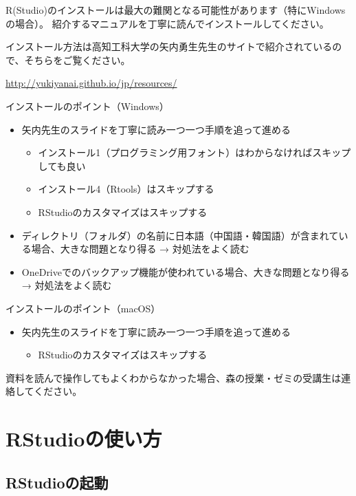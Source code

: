 \documentclass[]{book}
\providecommand{\tightlist}{%
  \setlength{\itemsep}{0pt}\setlength{\parskip}{0pt}}
\begin{document}
R(Studio)のインストールは最大の難関となる可能性があります（特にWindowsの場合）。
紹介するマニュアルを丁寧に読んでインストールしてください。

インストール方法は高知工科大学の矢内勇生先生のサイトで紹介されているので、そちらをご覧ください。

\url{http://yukiyanai.github.io/jp/resources/}

インストールのポイント（Windows）

\begin{itemize}
\tightlist
\item
  矢内先生のスライドを丁寧に読み一つ一つ手順を追って進める

  \begin{itemize}
  \tightlist
  \item
    インストール1（プログラミング用フォント）はわからなければスキップしても良い
  \item
    インストール4（Rtools）はスキップする
  \item
    RStudioのカスタマイズはスキップする
  \end{itemize}
\item
  ディレクトリ（フォルダ）の名前に日本語（中国語・韓国語）が含まれている場合、大きな問題となり得る
  → 対処法をよく読む
\item
  OneDriveでのバックアップ機能が使われている場合、大きな問題となり得る →
  対処法をよく読む
\end{itemize}

インストールのポイント（macOS）

\begin{itemize}
\tightlist
\item
  矢内先生のスライドを丁寧に読み一つ一つ手順を追って進める

  \begin{itemize}
  \tightlist
  \item
    RStudioのカスタマイズはスキップする
  \end{itemize}
\end{itemize}

資料を読んで操作してもよくわからなかった場合、森の授業・ゼミの受講生は連絡してください。

\chapter{RStudioの使い方}\label{RStudio}

\section{RStudioの起動}\label{rstudioux306eux8d77ux52d5}
\end{document}
